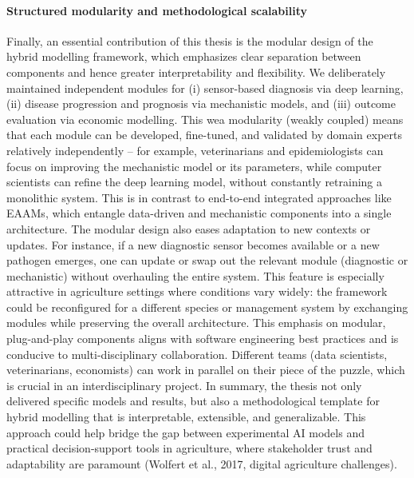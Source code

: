 \paragraph{Structured modularity and methodological scalability} Finally, an essential contribution of this thesis is the modular design of the hybrid modelling framework, which emphasizes clear separation between components and hence greater interpretability and flexibility. We deliberately maintained independent modules for (i) sensor-based diagnosis via deep learning, (ii) disease progression and prognosis via mechanistic models, and (iii) outcome evaluation via economic modelling. This wea modularity (weakly coupled) means that each module can be developed, fine-tuned, and validated by domain experts relatively independently – for example, veterinarians and epidemiologists can focus on improving the mechanistic model or its parameters, while computer scientists can refine the deep learning model, without constantly retraining a monolithic system. This is in contrast to end-to-end integrated approaches like EAAMs, which entangle data-driven and mechanistic components into a single architecture. The modular design also eases adaptation to new contexts or updates. For instance, if a new diagnostic sensor becomes available or a new pathogen emerges, one can update or swap out the relevant module (diagnostic or mechanistic) without overhauling the entire system. This feature is especially attractive in agriculture settings where conditions vary widely: the framework could be reconfigured for a different species or management system by exchanging modules while preserving the overall architecture. This emphasis on modular, plug-and-play components aligns with software engineering best practices and is conducive to multi-disciplinary collaboration. Different teams (data scientists, veterinarians, economists) can work in parallel on their piece of the puzzle, which is crucial in an interdisciplinary project. In summary, the thesis not only delivered specific models and results, but also a methodological template for hybrid modelling that is interpretable, extensible, and generalizable. This approach could help bridge the gap between experimental AI models and practical decision-support tools in agriculture, where stakeholder trust and adaptability are paramount (Wolfert et al., 2017, digital agriculture challenges).


